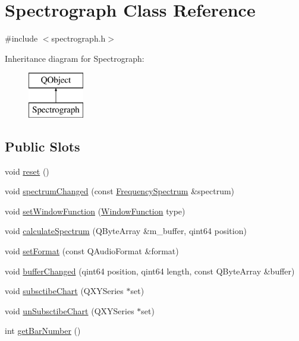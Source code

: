 \hypertarget{class_spectrograph}{}\section{Spectrograph Class Reference}
\label{class_spectrograph}


{\ttfamily \#include $<$spectrograph.\+h$>$}

Inheritance diagram for Spectrograph\+:\begin{figure}[H]
\begin{center}
\leavevmode
\includegraphics[height=2.000000cm]{class_spectrograph}
\end{center}
\end{figure}
\subsection*{Public Slots}
\begin{DoxyCompactItemize}
\item 
void \hyperlink{class_spectrograph_a63c0355273ab24b5206817695421747d}{reset} ()
\item 
void \hyperlink{class_spectrograph_af9cdafaa2e367c697a253a66e25c62a4}{spectrum\+Changed} (const \hyperlink{class_frequency_spectrum}{Frequency\+Spectrum} \&spectrum)
\item 
void \hyperlink{class_spectrograph_a3c6f5ae666d675d0326271511b38f4a2}{set\+Window\+Function} (\hyperlink{spectrum_8h_adae4545e1609513867a86cc5e91fc1d4}{Window\+Function} type)
\item 
void \hyperlink{class_spectrograph_aec6520868d48dc83485d6716b977f65b}{calculate\+Spectrum} (Q\+Byte\+Array \&m\+\_\+buffer, qint64 position)
\item 
void \hyperlink{class_spectrograph_ae267e7e06cb7eaec965150a73c21e4ce}{set\+Format} (const Q\+Audio\+Format \&format)
\item 
void \hyperlink{class_spectrograph_af6a83c1feec2657104a983ae334ceae3}{buffer\+Changed} (qint64 position, qint64 length, const Q\+Byte\+Array \&buffer)
\item 
void \hyperlink{class_spectrograph_a94b5df4c4d57b03cc588b2ecfc0d9596}{subsctibe\+Chart} (Q\+X\+Y\+Series $\ast$set)
\item 
void \hyperlink{class_spectrograph_a6c5811644f0e182a7814027f7d9b702c}{un\+Subsctibe\+Chart} (Q\+X\+Y\+Series $\ast$set)
\item 
int \hyperlink{class_spectrograph_a4a7f2b78c288816942356f2452166211}{get\+Bar\+Number} ()
\end{DoxyCompactItemize}
